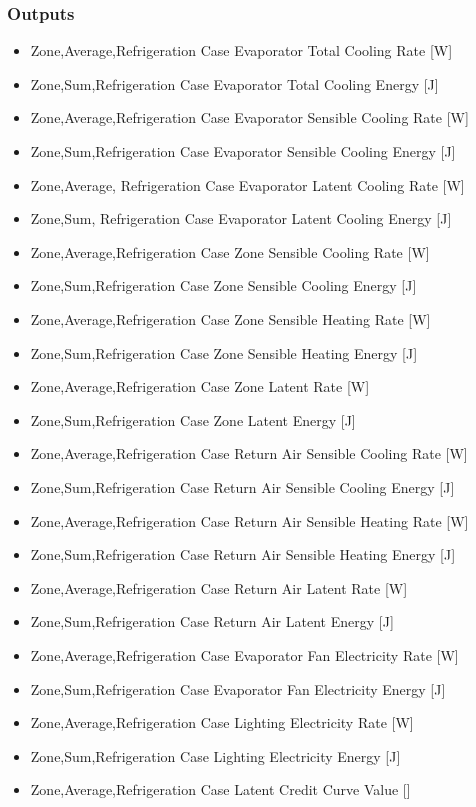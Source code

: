 \subsubsection{Outputs}\label{outputs-1-022}

\begin{itemize}
\item
  Zone,Average,Refrigeration Case Evaporator Total Cooling Rate {[}W{]}
\item
  Zone,Sum,Refrigeration Case Evaporator Total Cooling Energy {[}J{]}
\item
  Zone,Average,Refrigeration Case Evaporator Sensible Cooling Rate {[}W{]}
\item
  Zone,Sum,Refrigeration Case Evaporator Sensible Cooling Energy {[}J{]}
\item
  Zone,Average, Refrigeration Case Evaporator Latent Cooling Rate {[}W{]}
\item
  Zone,Sum, Refrigeration Case Evaporator Latent Cooling Energy {[}J{]}
\item
  Zone,Average,Refrigeration Case Zone Sensible Cooling Rate {[}W{]}
\item
  Zone,Sum,Refrigeration Case Zone Sensible Cooling Energy {[}J{]}
\item
  Zone,Average,Refrigeration Case Zone Sensible Heating Rate {[}W{]}
\item
  Zone,Sum,Refrigeration Case Zone Sensible Heating Energy {[}J{]}
\item
  Zone,Average,Refrigeration Case Zone Latent Rate {[}W{]}
\item
  Zone,Sum,Refrigeration Case Zone Latent Energy {[}J{]}
\item
  Zone,Average,Refrigeration Case Return Air Sensible Cooling Rate {[}W{]}
\item
  Zone,Sum,Refrigeration Case Return Air Sensible Cooling Energy {[}J{]}
\item
  Zone,Average,Refrigeration Case Return Air Sensible Heating Rate {[}W{]}
\item
  Zone,Sum,Refrigeration Case Return Air Sensible Heating Energy {[}J{]}
\item
  Zone,Average,Refrigeration Case Return Air Latent Rate {[}W{]}
\item
  Zone,Sum,Refrigeration Case Return Air Latent Energy {[}J{]}
\item
  Zone,Average,Refrigeration Case Evaporator Fan Electricity Rate {[}W{]}
\item
  Zone,Sum,Refrigeration Case Evaporator Fan Electricity Energy {[}J{]}
\item
  Zone,Average,Refrigeration Case Lighting Electricity Rate {[}W{]}
\item
  Zone,Sum,Refrigeration Case Lighting Electricity Energy {[}J{]}
\item
  Zone,Average,Refrigeration Case Latent Credit Curve Value {[]}
\end{itemize}

